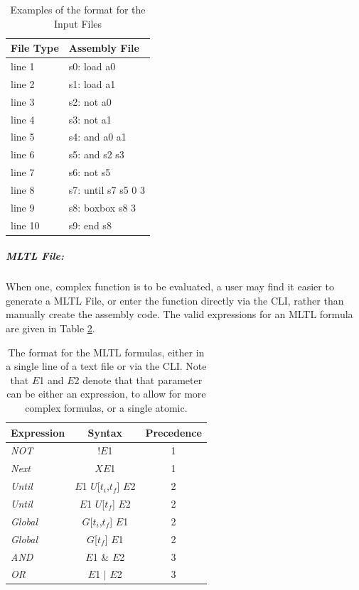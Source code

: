 \begin{table}[H]
	\caption{Examples of the format for the Input Files}
	\label{FileTable}
	\begin{center}
	\begin{tabular}{l | l}
		\hline
		\hline
		\textbf{File Type} & \textbf{Assembly File}\\
		\hline
		line 1 & s0: load a0\\
		line 2 & s1: load a1\\
		line 3 & s2: not a0\\
		line 4 & s3: not a1\\
		line 5 & s4: and a0 a1\\
		line 6 & s5: and s2 s3\\
		line 7 & s6: not s5\\
		line 8 & s7: until s7 s5 0 3\\
		line 9 & s8: boxbox s8 3\\
		line 10 & s9: end s8\\
		\hline
		\hline
	\end{tabular}
	\end{center}
\end{table}

\subparagraph{MLTL File:}
\label{MLTLFile}
When one, complex function is to be evaluated, a user may find it easier to generate a MLTL File, or enter the function directly via the CLI, rather than manually create the assembly code. The valid expressions for an MLTL formula are given in Table \ref{MLTLCommands}.

\begin{table}[H]
	\caption{The format for the MLTL formulas, either in a single line of a text file or via the CLI. Note that $E$1 and $E$2 denote that that parameter can be either an expression, to allow for more complex formulas, or a single atomic.}
	\label{MLTLCommands}
	\begin{center}
	\begin{tabular}{l | c | c}
		\hline
		\hline
		\textbf{Expression} & \textbf{Syntax} & \textbf{Precedence} \\
		\hline
		\textit{NOT} & !$E$1 & 1\\
		\textit{Next} & $XE$1 & 1\\
		\textit{Until} & $E$1 $U$[$t_i$,$t_f$] $E$2 & 2\\
		\textit{Until} & $E$1 $U$[$t_f$] $E$2 & 2\\
		\textit{Global} & $G$[$t_i$,$t_f$] $E$1 & 2\\
		\textit{Global} & $G$[$t_f$] $E$1 & 2\\
		\textit{AND} & $E$1 \& $E$2 & 3\\
		\textit{OR} & $E$1 $|$ $E$2 & 3\\
		\hline
		\hline
	\end{tabular}
	\end{center}
\end{table}

